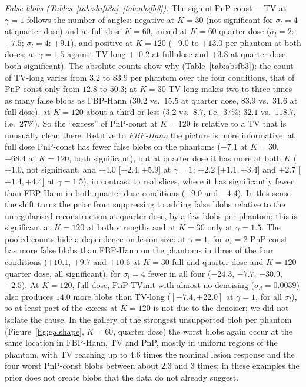 \emph{False blobs (Tables~\ref{tab:shift3a}--\ref{tab:absfb3}).} The sign of PnP-const $-$ TV at $\gamma=1$ follows the number of angles: negative at $K=30$ (not significant for $\sigma_l=4$ at quarter dose) and at full-dose $K=60$, mixed at $K=60$ quarter dose ($\sigma_l=2$: $-7.5$; $\sigma_l=4$: $+9.1$), and positive at $K=120$ ($+9.0$ to $+13.0$ per phantom at both doses; at $\gamma=1.5$ against TV-long $+10.2$ at full dose and $+3.8$ at quarter dose, both significant).
The absolute counts show why (Table~\ref{tab:absfb3}): the count of TV-long varies from $3.2$ to $83.9$ per phantom over the four conditions, that of PnP-const only from $12.8$ to $50.3$; at $K=30$ TV-long makes two to three times as many false blobs as FBP-Hann ($30.2$ vs.\ $15.5$ at quarter dose, $83.9$ vs.\ $31.6$ at full dose), at $K=120$ about a third or less ($3.2$ vs.\ $8.7$, i.e.\ $37\%$; $32.1$ vs.\ $118.7$, i.e.\ $27\%$).
So the ``excess'' of PnP-const at $K=120$ is relative to a TV that is unusually clean there. Relative to \emph{FBP-Hann} the picture is more informative: at full dose PnP-const has fewer false blobs on the phantoms ($-7.1$ at $K=30$, $-68.4$ at $K=120$, both significant), but at quarter dose it has more at both $K$ ($+1.0$, not significant, and $+4.0$ [$+2.4,+5.9$] at $\gamma=1$;
$+2.2$ [$+1.1,+3.4$] and $+2.7$ [$+1.4,+4.4$] at $\gamma=1.5$), in contrast to real slices, where it has significantly fewer than FBP-Hann in both quarter-dose conditions ($-9.0$ and $-4.4$). In this sense the shift turns the prior from suppressing to adding false blobs relative to the unregularised reconstruction at quarter dose, by a few blobs per phantom; this is significant at $K=120$ at both strengths and at $K=30$ only at $\gamma=1.5$. The pooled counts hide a dependence on lesion size: at $\gamma=1$, for $\sigma_l=2$ PnP-const has more false blobs than FBP-Hann on the phantoms in three of the four conditions ($+10.1$, $+9.7$ and $+10.6$ at $K=30$ full and quarter dose and $K=120$ quarter dose, all significant), for $\sigma_l=4$ fewer in all four ($-24.3$, $-7.7$, $-30.9$, $-2.5$).
At $K=120$, full dose, PnP-TVinit with almost no denoising ($\sigma_d=0.0039$) also produces $14.0$ more blobs than TV-long ($[+7.4,+22.0]$ at $\gamma=1$, for all $\sigma_l$), so at least part of the excess at $K=120$ is not due to the denoiser; we did not isolate the cause.
In the gallery of the strongest unsupported blob per phantom (Figure~\ref{fig:galshape}, $K=60$, quarter dose) the worst blobs again occur at the same location in FBP-Hann, TV and PnP, mostly in uniform regions of the phantom, with TV reaching up to $4.6$ times the nominal lesion response and the four worst PnP-const blobs between about $2.3$ and $3$ times; in these examples the prior does not create blobs that the data do not already suggest.

